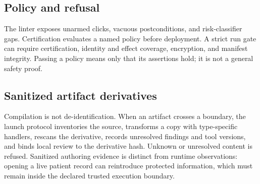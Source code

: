 \subsection{Policy and refusal}
The linter exposes unarmed clicks, vacuous postconditions, and risk-classifier
gaps. Certification evaluates a named policy before deployment. A strict run
gate can require certification, identity and effect coverage, encryption, and
manifest integrity. Passing a policy means only that its assertions hold; it is
not a general safety proof.

\subsection{Sanitized artifact derivatives}
Compilation is not de-identification. When an artifact crosses a boundary, the
launch protocol inventories the source, transforms a copy with type-specific
handlers, rescans the derivative, records unresolved findings and tool versions,
and binds local review to the derivative hash. Unknown or unresolved content is
refused. Sanitized authoring evidence is distinct from runtime observations:
opening a live patient record can reintroduce protected information, which must
remain inside the declared trusted execution boundary.

